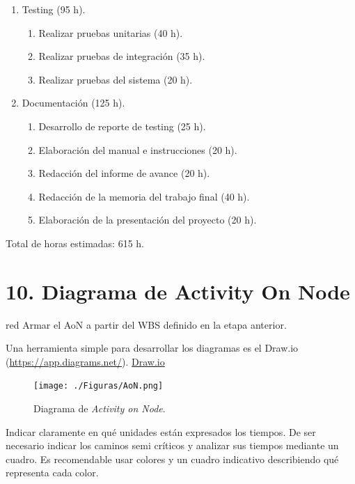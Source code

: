 \documentclass[
11pt, %
]{charter}
\begin{document}
\begin{enumerate}
\begin{enumerate}
	\end{enumerate}		
		
\item Testing (95 h).
	
	\begin{enumerate}
	\item Realizar pruebas unitarias (40 h).
	\item Realizar pruebas de integración (35 h).
	\item Realizar pruebas del sistema (20 h).
	\end{enumerate}		
		
		
\item Documentación (125 h).

	\begin{enumerate}
	\item Desarrollo de reporte de testing (25 h).
	\item Elaboración del manual e instrucciones (20 h).
	\item Redacción del informe de avance (20 h).
	\item Redacción de la memoria del trabajo final (40 h).
	\item Elaboración de la presentación del proyecto (20 h).
	\end{enumerate}

\end{enumerate}

Total de horas estimadas: 615 h.

\section{10. Diagrama de Activity On Node}
\label{sec:AoN}

\begin{consigna}{red}
Armar el AoN a partir del WBS definido en la etapa anterior.

Una herramienta simple para desarrollar los diagramas es el Draw.io (\url{https://app.diagrams.net/}).
\href{https://app.diagrams.net}{Draw.io}


\begin{figure}[htpb]
\centering 
\texttt{[image: ./Figuras/AoN.png]}
\caption{Diagrama de \textit{Activity on Node}.}
\label{fig:AoN}
\end{figure}

Indicar claramente en qué unidades están expresados los tiempos.
De ser necesario indicar los caminos semi críticos y analizar sus tiempos mediante un cuadro.
Es recomendable usar colores y un cuadro indicativo describiendo qué representa cada color.

\end{consigna}
\end{document}
